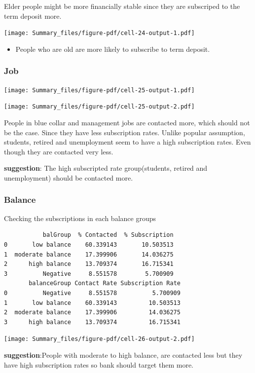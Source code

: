 \documentclass[
  letterpaper,
  DIV=11,
  numbers=noendperiod]{scrartcl}
\providecommand{\tightlist}{%
  \setlength{\itemsep}{0pt}\setlength{\parskip}{0pt}}\usepackage{longtable,booktabs,array}
\begin{document}
Elder people might be more financially stable since they are subscriped
to the term deposit more.

\texttt{[image: Summary\_files/figure-pdf/cell-24-output-1.pdf]}

\begin{itemize}
\tightlist
\item
  People who are old are more likely to subscribe to term deposit.
\end{itemize}

\hypertarget{job}{%
\subsubsection{Job}\label{job}}

\texttt{[image: Summary\_files/figure-pdf/cell-25-output-1.pdf]}

\texttt{[image: Summary\_files/figure-pdf/cell-25-output-2.pdf]}

People in blue collar and management jobs are contacted more, which
should not be the case. Since they have less subscription rates. Unlike
popular assumption, students, retired and unemployment seem to have a
high subscription rates. Even though they are contacted very less.

\textbf{suggestion}: The high subscripted rate group(students, retired
and unemployment) should be contacted more.

\hypertarget{balance}{%
\subsubsection{Balance}\label{balance}}

Checking the subscriptions in each balance groups

\begin{verbatim}
           balGroup  % Contacted  % Subscription
0       low balance    60.339143       10.503513
1  moderate balance    17.399906       14.036275
2      high balance    13.709374       16.715341
3          Negative     8.551578        5.700909
       balanceGroup Contact Rate Subscription Rate
0          Negative     8.551578          5.700909
1       low balance    60.339143         10.503513
2  moderate balance    17.399906         14.036275
3      high balance    13.709374         16.715341
\end{verbatim}

\texttt{[image: Summary\_files/figure-pdf/cell-26-output-2.pdf]}

\textbf{suggestion}:People with moderate to high balance, are contacted
less but they have high subscription rates so bank should target them
more.
\end{document}
